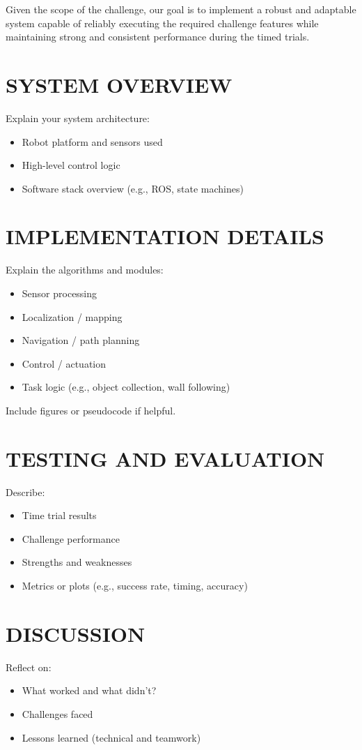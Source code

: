 \documentclass[letterpaper, 10 pt, conference]{ieeeconf}  %
\begin{document}
Given the scope of the challenge, our goal is to implement a robust and adaptable system capable of reliably executing the required challenge features while maintaining strong and consistent performance during the timed trials.

\section{SYSTEM OVERVIEW}
Explain your system architecture:
\begin{itemize}
    \item Robot platform and sensors used
    \item High-level control logic
    \item Software stack overview (e.g., ROS, state machines)
\end{itemize}

\section{IMPLEMENTATION DETAILS}
Explain the algorithms and modules:
\begin{itemize}
    \item Sensor processing
    \item Localization / mapping
    \item Navigation / path planning
    \item Control / actuation
    \item Task logic (e.g., object collection, wall following)
\end{itemize}
Include figures or pseudocode if helpful.

\section{TESTING AND EVALUATION}
Describe:
\begin{itemize}
    \item Time trial results
    \item Challenge performance
    \item Strengths and weaknesses
    \item Metrics or plots (e.g., success rate, timing, accuracy)
\end{itemize}

\section{DISCUSSION}
Reflect on:
\begin{itemize}
    \item What worked and what didn’t?
    \item Challenges faced
    \item Lessons learned (technical and teamwork)
\end{itemize}
\end{document}
